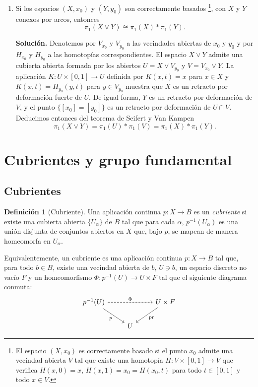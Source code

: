 \documentclass[11pt,a4paper]{article}
\theoremstyle{plain}
\theoremstyle{definition}
\newtheorem{definition}[theorem]{Definición}
\theoremstyle{remark}
\begin{document}
\begin{enumerate}[label=\arabic*.,leftmargin=*]
\item Si los espacios $(X,x_0)$ y $(Y,y_0)$ son correctamente basados
\footnote{El espacio $(X,x_0)$ es correctamente basado si el punto $x_0$
admite una vecindad abierta $V$ tal que existe una homotopía
$H:V\times[0,1]\to V$ que verifica $H(x,0)=x$, $H(x,1)=x_0=H(x_0,t)$ para
todo $t\in[0,1]$ y todo $x\in V$.}, con $X$ y $Y$ conexos por arcos,
entonces
\[
\pi_1(X\vee Y)\cong\pi_1(X)*\pi_1(Y).
\]

\noindent\textbf{Solución.} Denotemos por $V_{x_0}$ y $V_{y_0}$ a las
vecindades abiertas de $x_0$ y $y_0$ y por $H_{x_0}$ y $H_{y_0}$ a las
homotopías correspondientes. El espacio $X\vee Y$ admite una cubierta
abierta formada por los abiertos $U=X\vee V_{y_0}$ y $V=V_{x_0}\vee Y$. La
aplicación $K:U\times[0,1]\to U$ definida por $K(x,t)=x$ para $x\in X$ y
$K(x,t)=H_{y_0}(y,t)$ para $y\in V_{y_0}$ muestra que $X$ es un retracto por
deformación fuerte de $U$. De igual forma, $Y$ es un retracto por
deformación de $V$, y el punto $\{[x_0]=[y_0]\}$ es un retracto por
deformación de $U\cap V$. Deducimos entonces del teorema de Seifert y Van
Kampen
\[
\pi_1(X\vee Y)=\pi_1(U)*\pi_1(V)=\pi_1(X)*\pi_1(Y).
\]

\end{enumerate}

\section{Cubrientes y grupo fundamental}

\subsection{Cubrientes}

\begin{definition}[Cubriente]
\label{def:cubriente}
Una aplicación continua $p:X\to B$ es un \emph{cubriente} si existe una
cubierta abierta $\{U_\alpha\}$ de $B$ tal que para cada $\alpha$,
$p^{-1}(U_\alpha)$ es una unión disjunta de conjuntos abiertos en $X$ que,
bajo $p$, se mapean de manera homeomorfa en $U_\alpha$.

Equivalentemente, un cubriente es una aplicación continua $p:X\to B$ tal
que, para todo $b\in B$, existe una vecindad abierta de $b$, $U\ni b$, un
espacio discreto no vacío $F$ y un homeomorfismo $\Phi:p^{-1}(U)\to U\times F$
tal que el siguiente diagrama conmuta:
\[
\begin{tikzcd}
p^{-1}(U) \arrow[rr,"\Phi",dashed] \arrow[dr,swap,"p"] & & U\times F \arrow[dl,"\mathrm{pr}"] \\
& U &
\end{tikzcd}
\]
\end{definition}
\end{document}

